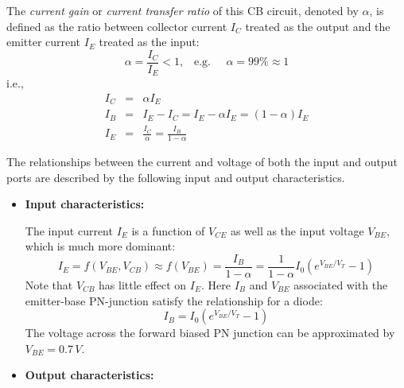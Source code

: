 \documentclass{article}
\begin{document}
\begin{itemize}

The {\em current gain} or {\em current transfer ratio} of this CB circuit,
denoted by $\alpha$, is defined as the ratio between collector current 
$I_C$ treated as the output and the emitter current $I_E$ treated as the 
input:
\begin{equation} 
\alpha=\frac{I_C}{I_E}<1,\;\;\;\mbox{e.g.}\;\;\;\;\;\alpha =99\% \approx 1
\end{equation}
i.e., 
\begin{eqnarray}
  I_C& = &\alpha I_E 
  \nonumber\\
  I_B& =&I_E-I_C=I_E-\alpha I_E=(1-\alpha)I_E
  \nonumber\\
  I_E&=&\frac{I_C}{\alpha}=\frac{I_B}{1-\alpha}
\end{eqnarray}

The relationships between the current and voltage of both the input 
and output ports are described by the following input and output 
characteristics.

\begin{itemize}
\item {\bf Input characteristics:} 

    The input current $I_E$ is a function of $V_{CE}$ as well as the input
    voltage $V_{BE}$, which is much more dominant:
    \begin{equation} 
    I_E=f(V_{BE}, V_{CB})\approx f(V_{BE})=\frac{I_B}{1-\alpha}
    =\frac{1}{1-\alpha} I_0 ( e^{V_{BE}/V_T}-1 )	
    \end{equation}
    Note that $V_{CB}$ has little effect on $I_E$.
    Here $I_B$ and $V_{BE}$ associated with the emitter-base PN-junction 
    satisfy the relationship for a diode:
    \begin{equation}
    I_B=I_0 ( e^{V_{BE}/V_T}-1 )	
    \end{equation}
    The voltage across the forward biased PN junction can be approximated
    by $V_{BE}=0.7\,V$. 

  \item {\bf Output characteristics:} 


\end{itemize}
\end{itemize}
\end{document}
